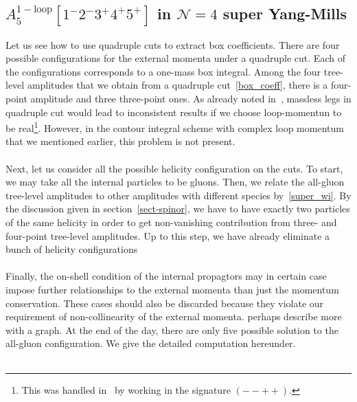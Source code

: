 \subsection{$A_5^{\mathrm{1-loop}}[1^-2^-3^+4^+5^+]$ in $\mathcal{N}=4$ super Yang-Mills}
Let us see how to use quadruple cuts to extract box coefficients. 
There are four possible configurations for the external momenta under a quadruple cut.
Each of the configurations corresponds to a one-mass box integral.
Among the four tree-level amplitudes that we obtain from a quadruple cut~\cref{box_coeff}, there is a four-point amplitude and three three-point ones.
As already noted in~\cite{Britto:2004nc}, massless legs in quadruple cut would lead to inconsistent results if we choose loop-momentun to be real\footnote{This was handled in~\cite{Britto:2004nc} by working in the signature $(--++)$.}. 
However, in the contour integral scheme with complex loop momentum that we mentioned earlier, this problem is not present.
\\\\
Next, let us consider all the possible helicity configuration on the cuts.
To start, we may take all the internal particles to be gluons. 
Then, we relate the all-gluon tree-level amplitudes to other amplitudes with different species by~\cref{super_wi}. 
By the discussion given in section~\ref{sect-spinor}, we have to have exactly two particles of the same helicity in order to get non-vanishing contribution from three- and four-point tree-level amplitudes.
Up to this step, we have already eliminate a bunch of helicity configurations
\\\\
Finally, the on-shell condition of the internal propagtors may in certain case impose further relationships to the external momenta than just the momentum conservation.
These cases should also be discarded because they violate our requirement of non-collinearity of the external momenta. 
\color{red}perhaps describe more with a graph.\color{black}
At the end of the day, there are only five possible solution to the all-gluon configuration.
We give the detailed computation hereunder.
\\\\
\iffalse
\begin{figure}[h!]
  \centering
    \texttt{[image: A5-1]}
    \caption{A5-1}
  \label{A5-1}
\end{figure}
\fi
